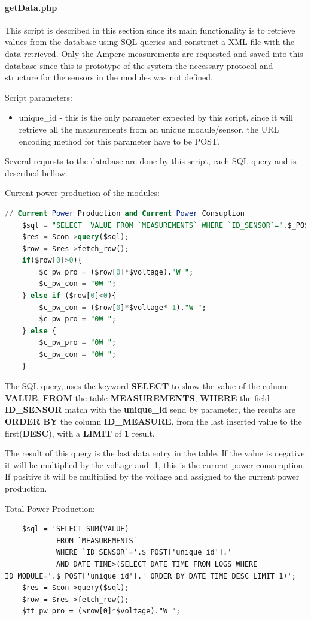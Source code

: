 \paragraph{getData.php} This script is described in this section since its main functionality is to retrieve values from the database using SQL queries and construct a XML file with the data retrieved. Only the Ampere measurements are requested and saved into this database since this is prototype of the system the necessary protocol and structure for the sensors in the modules was not defined.

Script parameters:
\begin{itemize}
	\item unique\_id - this is the only parameter expected by this script, since it will retrieve all the measurements from an unique module/sensor, the URL encoding method for this parameter have to be POST.
\end{itemize}

Several requests to the database are done by this script, each SQL query and is described bellow:

Current power production of the modules:
\begin{lstlisting}[language=sql]
// Current Power Production and Current Power Consuption
	$sql = "SELECT  VALUE FROM `MEASUREMENTS` WHERE `ID_SENSOR`=".$_POST['unique_id']." ORDER BY ID_MEASURE DESC LIMIT 1";
	$res = $con->query($sql);
	$row = $res->fetch_row();
	if($row[0]>0){
		$c_pw_pro = ($row[0]*$voltage)."W ";
		$c_pw_con = "0W ";
	} else if ($row[0]<0){
		$c_pw_con = ($row[0]*$voltage*-1)."W ";
		$c_pw_pro = "0W ";
	} else {
		$c_pw_pro = "0W ";
		$c_pw_con = "0W ";
	}
\end{lstlisting}

The SQL query, uses the keyword \textbf{SELECT} to show the value of the column \textbf{VALUE}, \textbf{FROM} the table \textbf{MEASUREMENTS}, \textbf{WHERE} the field \textbf{ID\_SENSOR} match with the \textbf{unique\_id} send by parameter, the results are \textbf{ORDER BY} the column \textbf{ID\_MEASURE}, from the last inserted value to the first(\textbf{DESC}), with a \textbf{LIMIT} of \textbf{1} result.

The result of this query is the last data entry in the table. If the value is negative it will be multiplied by the voltage and -1, this is the current power consumption. If positive it will be multiplied by the voltage and assigned to the current power production.

Total Power Production:
\begin{lstlisting}
	$sql = 'SELECT SUM(VALUE) 
			FROM `MEASUREMENTS` 
			WHERE `ID_SENSOR`='.$_POST['unique_id'].'
			AND DATE_TIME>(SELECT DATE_TIME FROM LOGS WHERE ID_MODULE='.$_POST['unique_id'].' ORDER BY DATE_TIME DESC LIMIT 1)';
	$res = $con->query($sql);
	$row = $res->fetch_row();
	$tt_pw_pro = ($row[0]*$voltage)."W ";
\end{lstlisting}

